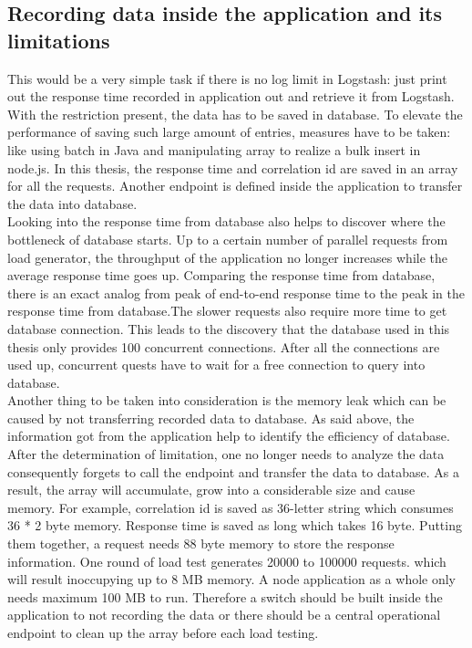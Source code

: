   \subsection{Recording data inside the application and its limitations}
This would be a very simple task if there is no log limit in Logstash: just print out the response time recorded in application out and retrieve it from Logstash. With the restriction present, the data has to be saved in database. To elevate the performance of saving such large amount of entries, measures have to be taken: like using batch in Java and manipulating array to realize a bulk insert in node.js. In this thesis, the response time and correlation id are saved in an array for all the requests. Another endpoint is defined inside the application to transfer the data into database.\\
Looking into the response time from database also helps to discover where the bottleneck of database starts. Up to a certain number of parallel requests from load generator, the throughput of the application no longer increases while the average response time goes up. Comparing the response time from database, there is an exact analog from peak of end-to-end response time to the peak in the response time from database.The slower requests also require more time to get database connection. This leads to the discovery that the database used in this thesis only provides 100  concurrent connections. After all the connections are used up, concurrent quests have to wait for a free connection to query into database. \\
Another thing to be taken into consideration is the memory leak which can be caused by not transferring recorded data to database. As said above, the information got from the application help to identify the efficiency of database. After the determination of limitation, one no longer needs to analyze the data consequently forgets to call the endpoint and transfer the data to database. As a result, the array will accumulate, grow into a considerable size and cause memory. For example, correlation id is saved as 36-letter string which consumes 36 * 2 byte memory. Response time is saved as long which takes 16 byte. Putting them together, a request needs 88 byte memory to store the response information. One round of load test generates 20000 to 100000 requests. which will result inoccupying up to 8 MB memory. A node application as a whole only needs maximum 100 MB to run. Therefore a switch should be built inside the application to not recording the data or there should be a central operational endpoint to clean up the array before each load testing. 
